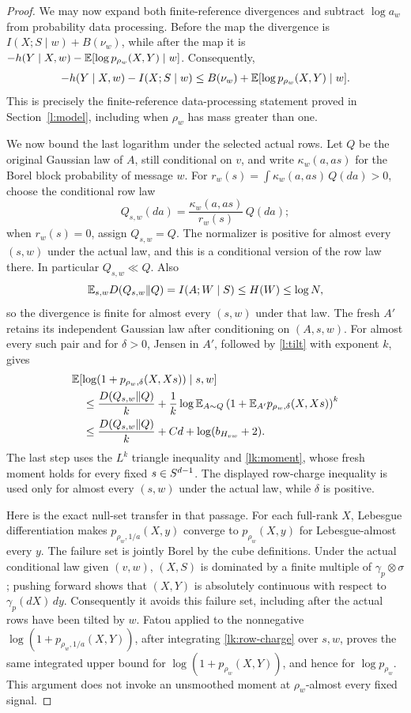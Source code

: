 \begin{proof}
We may now expand both finite-reference divergences and subtract
\(\log a_w\) from probability data processing. Before the map the
divergence is \(I(X;S\mid w)+B(\nu_w)\), while after the map it is
\(-h(Y\mid X,w)-\mathbb E[\log p_{\rho_w}(X,Y)\mid w]\). Consequently,
\begin{equation}\label{lk:finite-reference}
 -h(Y\mid X,w)-I(X;S\mid w)
 \le B(\nu_w)+\mathbb E[\log p_{\rho_w}(X,Y)\mid w].
\end{equation}
This is precisely the finite-reference data-processing statement
proved in Section~\ref{l:model}, including when \(\rho_w\) has mass
greater than one.

We now bound the last logarithm under the selected actual rows. Let
\(Q\) be the original Gaussian law of \(A\), still conditional on
\(v\), and write \(\kappa_w(a,as)\) for the Borel block probability
of message \(w\). For \(r_w(s)=\int\kappa_w(a,as)\,Q(da)>0\), choose
the conditional row law
\[
 Q_{s,w}(da)=\frac{\kappa_w(a,as)}{r_w(s)}\,Q(da);
\]
when \(r_w(s)=0\), assign \(Q_{s,w}=Q\). The normalizer is positive
for almost every \((s,w)\) under the actual law, and this is a
conditional version of the row law there. In particular
\(Q_{s,w}\ll Q\). Also
\[
 \mathbb E_{s,w}D(Q_{s,w}\|Q)=I(A;W\mid S)\le H(W)\le\log N,
\]
so the divergence is finite for almost every \((s,w)\) under that law.
The fresh \(A'\) retains its independent Gaussian law after
conditioning on \((A,s,w)\). For almost every such pair and for
\(\delta>0\), Jensen in \(A'\), followed by \eqref{l:tilt}
with exponent \(k\), gives
\begin{align}
 &\mathbb E[\log(1+p_{\rho_w,\delta}(X,Xs))\mid s,w]\notag\\
 &\quad\le\frac{D(Q_{s,w}\|Q)}k+
 \frac1k\log\mathbb E_{A\sim Q}
       \left(1+\mathbb E_{A'}p_{\rho_w,\delta}(X,Xs)\right)^k\notag\\
 &\quad\le\frac{D(Q_{s,w}\|Q)}k+Cd+\log(b_{H_{vw}}+2).
 \label{lk:row-charge}
\end{align}
The last step uses the \(L^k\) triangle inequality and
\eqref{lk:moment}, whose fresh moment holds for every fixed
\(s\in S^{d-1}\). The displayed row-charge inequality is used only
for almost every \((s,w)\) under the actual law, while \(\delta\)
is positive.

Here is the exact null-set transfer in that passage. For each
full-rank \(X\), Lebesgue differentiation makes
\(p_{\rho_w,1/a}(X,y)\) converge to \(p_{\rho_w}(X,y)\)
for Lebesgue-almost every \(y\). The failure set is jointly Borel
by the cube definitions. Under the actual conditional law given
\((v,w)\), \((X,S)\) is dominated by a finite multiple of
\(\gamma_p\otimes\sigma\); pushing forward shows that \((X,Y)\)
is absolutely continuous with respect to \(\gamma_p(dX)\,dy\).
Consequently it avoids this failure set, including after the actual
rows have been tilted by \(w\). Fatou applied to the nonnegative
\(\log(1+p_{\rho_w,1/a}(X,Y))\), after integrating \eqref{lk:row-charge}
over \(s,w\), proves the same integrated upper bound for
\(\log(1+p_{\rho_w}(X,Y))\), and hence for \(\log p_{\rho_w}\).
This argument does not invoke an unsmoothed moment at
\(\rho_w\)-almost every fixed signal.


\end{proof}
